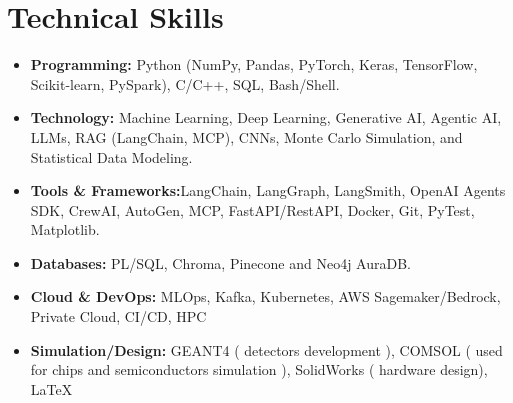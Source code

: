 \documentclass[a4paper,10pt]{article}
\begin{document}
\section{Technical Skills}
\begin{itemize}[leftmargin=0.5cm]
  \item \textbf{Programming:} Python (NumPy, Pandas, PyTorch, Keras, TensorFlow, Scikit-learn, PySpark), C/C++, SQL, Bash/Shell.
  \item \textbf{Technology:} Machine Learning, Deep Learning, Generative AI, Agentic AI, LLMs, RAG (LangChain, MCP), CNNs, Monte Carlo Simulation, and Statistical Data Modeling.
  \item \textbf{Tools \& Frameworks:}LangChain, LangGraph, LangSmith, OpenAI Agents SDK, CrewAI, AutoGen, MCP, FastAPI/RestAPI, Docker, Git, PyTest, Matplotlib.
  
  \item \textbf{Databases:} PL/SQL, Chroma, Pinecone and Neo4j AuraDB.
  \item \textbf{Cloud \& DevOps:} MLOps, Kafka, Kubernetes, AWS Sagemaker/Bedrock, Private Cloud, CI/CD, HPC
  \item \textbf{Simulation/Design:} GEANT4 ( detectors development ), COMSOL ( used for chips and semiconductors simulation ), SolidWorks ( hardware design), LaTeX
\end{itemize}
\end{document}
